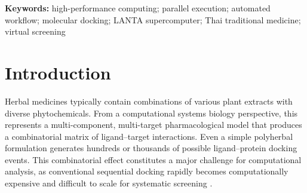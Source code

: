 \documentclass[11pt,a4paper]{article}
\begin{document}
\begin{abstract}
\noindent
The multi-component nature of traditional herbal formulations poses a significant challenge for computational drug discovery, as multiple phytochemicals simultaneously interact with various biological targets. This combinatorial complexity generates large docking matrices that demand substantial computational resources. We present a high-performance computing (HPC)-accelerated automated workflow for multi-target virtual screening, validated on a Thai traditional anti-asthma polyherbal formulation containing \textit{Aloe vera}, \textit{Cocos nucifera}, \textit{Solanum xanthocarpum}, and \textit{Zingiber montanum}. The workflow achieved a \SI{92.9}{\percent} data reduction through bioinformatics filtering, prioritizing 14 protein targets from 197 raw predictions. Benchmarking on the LANTA supercomputer demonstrated a 118.59-fold practical speedup, reducing the wall-clock time for 126 docking pairs from \SI{8.4}{hours} (sequential, workstation) to \SI{4.25}{minutes} (parallel, HPC), with throughput increasing from 15 to 1,779~docking~jobs/hour. Parallel efficiency reached \SI{94.12}{\percent} with high numerical fidelity ($r = 0.9974$). Scalability projections indicated feasibility for datasets of up to $10^6$ docking pairs. The case study identified solasodine as a promising candidate with strong predicted binding to PTGS2 (COX-2) and ALDH1A1. The workflow architecture, benchmarking methodology, and scalability analysis provide a reusable framework for HPC-accelerated virtual screening of multi-component natural product formulations.
\end{abstract}

\noindent\textbf{Keywords:} high-performance computing; parallel execution; automated workflow; molecular docking; LANTA supercomputer; Thai traditional medicine; virtual screening

\section{Introduction}

Herbal medicines typically contain combinations of various plant extracts with diverse phytochemicals. From a computational systems biology perspective, this represents a multi-component, multi-target pharmacological model that produces a combinatorial matrix of ligand--target interactions. Even a simple polyherbal formulation generates hundreds or thousands of possible ligand--protein docking events. This combinatorial effect constitutes a major challenge for computational analysis, as conventional sequential docking rapidly becomes computationally expensive and difficult to scale for systematic screening \cite{jeyasingh2024,babalola2025}.
\end{document}
